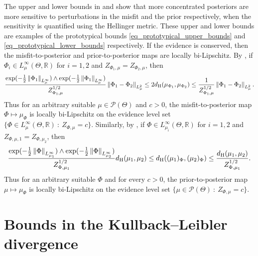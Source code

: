 \documentclass[a4paper]{scrartcl}
\theoremstyle{definition}
\numberwithin{equation}{section}
\newcommand{\R}{\mathbb{R}}
\newcommand{\Norm}[1]{\left\Vert #1 \right\Vert}
\newcommand{\Hel}[0]{\textup{H}}
\begin{document}
The upper and lower bounds in  and  show that more concentrated posteriors are more sensitive to perturbations in the misfit and the prior respectively, when the sensitivity is quantified using the Hellinger metric.
These upper and lower bounds are examples of the prototypical bounds \eqref{eq_prototypical_upper_bounds} and \eqref{eq_prototypical_lower_bounds} respectively.
If the evidence is conserved, then the misfit-to-posterior and prior-to-posterior maps are locally bi-Lipschitz.
By , if $\Phi_i\in L^\infty_\mu(\Theta,\R)$ for $i=1,2$ and $Z_{\Phi_1,\mu}=Z_{\Phi_2,\mu}$, then
\begin{equation*}
 \frac{\exp(-\tfrac{1}{2}\Norm{\Phi_1}_{L^\infty_\mu})\wedge \exp(-\tfrac{1}{2}\Norm{\Phi_1}_{L^\infty_\mu})}{Z_{\Phi_1,\mu}^{1/2}}\Norm{\Phi_1-\Phi_2}_{L^2_\mu} \leq 2 d_{\Hel}(\mu_{\Phi_1},\mu_{\Phi_2}) \leq \frac{1}{Z_{\Phi_1,\mu}^{1/2}}\Norm{\Phi_1-\Phi_2}_{L^2_\mu}.
\end{equation*}
Thus for an arbitrary suitable $\mu\in\mathcal{P}(\Theta)$ and $c>0$, the misfit-to-posterior map $\Phi\mapsto \mu_\Phi$ is locally bi-Lipschitz on the evidence level set $\{\Phi\in L^\infty_\mu(\Theta,\R)\ :\ Z_{\Phi,\mu}=c\}$.
Similarly, by , if $\Phi\in L^\infty_{\mu_i}(\Theta,\R)$ for $i=1,2$ and $Z_{\Phi,\mu,1}=Z_{\Phi,\mu_2}$, then
\begin{equation*}
 \frac{\exp(-\tfrac{1}{2}\Norm{\Phi}_{L^\infty_{\mu_1}})\wedge \exp(-\tfrac{1}{2}\Norm{\Phi}_{L^\infty_{\mu_2}})}{Z_{\Phi,\mu_1}^{1/2}}d_{\Hel}(\mu_1,\mu_2) \leq d_{\Hel}((\mu_1)_{\Phi},(\mu_2)_{\Phi}) \leq \frac{d_{\Hel}(\mu_1,\mu_2)}{Z_{\Phi,\mu_1}^{1/2}}.
\end{equation*}
Thus for an arbitrary suitable $\Phi$ and for every $c>0$, the prior-to-posterior map $\mu\mapsto \mu_\Phi$ is locally bi-Lipschitz on the evidence level set $\{\mu\in \mathcal{P}(\Theta)\ :\  Z_{\Phi,\mu}=c\}$.


\section{Bounds in the Kullback--Leibler divergence}
\label{sectionKLbounds}
\end{document}

